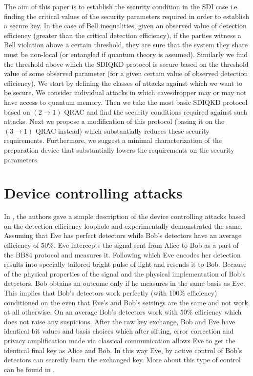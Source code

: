 \documentclass[smallextended]{svjour3}
\begin{document}
The aim of this paper is to establish the security condition in the SDI case i.e. finding the critical values of the security parameters required in order to establish a secure key. In the case of Bell inequalities, given an observed value of detection efficiency (greater than the critical detection efficiency), if the parties witness a Bell violation above a certain threshold, they are sure that the system they share must be non-local (or entangled if quantum theory is assumed). Similarly we find the threshold above which the SDIQKD protocol is secure based on the threshold value of some observed parameter (for a given certain value of observed detection efficiency). We start by defining the classes of attacks against which we want to be secure. We consider individual attacks in which eavesdropper may or may not have access to quantum memory. Then we take the most basic SDIQKD protocol based on $(2\to1)$ QRAC \cite{pawlowski2011semi} and find the security conditions required against such attacks. Next we propose a modification of this protocol (basing it on the $(3\to1)$ QRAC instead) which substantially reduces these security requirements. Furthermore, we suggest a minimal characterization of the preparation device that substantially lowers the requirements on the security parameters.
\section{Device controlling attacks}

In \cite{lydersen2010hacking,Makarow4}, the authors gave a simple description of the device controlling attacks based on the detection efficiency loophole and experimentally demonstrated the same. Assuming that Eve has perfect detectors while Bob's detectors have an average efficiency of $50\%$. Eve intercepts the signal sent from Alice to Bob as a part of the BB84 protocol and measures it. Following which Eve encodes her detection results into specially tailored bright pulse of light and resends it to Bob. Because of the physical properties of the signal and the physical implementation of Bob's detectors, Bob obtains an outcome only if he measures in the same basis as Eve. This implies that Bob's detectors work perfectly (with 100$\%$ efficiency) conditioned on the even that Eve's and Bob's settings are the same and not work at all otherwise. On an average Bob's detectors work with $50\%$ efficiency which does not raise any suspicions. After the raw key exchange, Bob and Eve have identical bit values and basis choices which after sifting, error correction and privacy amplification made via classical communication allows Eve to get the identical final key as Alice and Bob. In this way Eve, by active control of Bob's detectors can secretly learn the exchanged key. More about this type of control can be found in \cite{Makarov3}.
\end{document}
